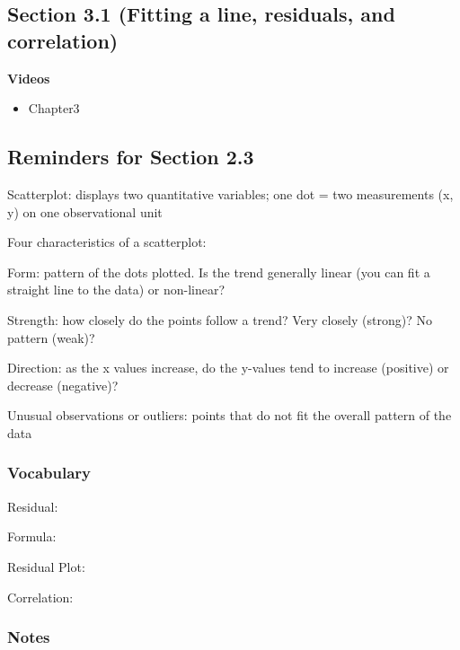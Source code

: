 \documentclass[
]{report}
\providecommand{\tightlist}{%
  \setlength{\itemsep}{0pt}\setlength{\parskip}{0pt}}
\newcommand{\rgs}{\vspace{12pt}} %
\newcommand{\rgi}{\hspace{24pt}}  %
\begin{document}
\hypertarget{section-3.1-fitting-a-line-residuals-and-correlation}{%
\subsection*{Section 3.1 (Fitting a line, residuals, and correlation)}\label{section-3.1-fitting-a-line-residuals-and-correlation}}


\textbf{Videos}

\begin{itemize}
\tightlist
\item
  Chapter3
\end{itemize}


\hypertarget{reminders-for-section-2.3}{%
\subsection{Reminders for Section 2.3}\label{reminders-for-section-2.3}}

Scatterplot: displays two quantitative variables; one dot = two measurements (x, y) on one observational unit

Four characteristics of a scatterplot:

\rgi Form: pattern of the dots plotted. Is the trend generally linear (you can fit a straight line to the data) or non-linear?

\rgi Strength: how closely do the points follow a trend? Very closely (strong)? No pattern (weak)?

\rgi Direction: as the x values increase, do the y-values tend to increase (positive) or decrease (negative)?

\rgi Unusual observations or outliers: points that do not fit the overall pattern of the data

\hypertarget{vocabulary-6}{%
\subsubsection*{Vocabulary}\label{vocabulary-6}}

Residual:
\rgs

\rgi Formula:
\rgs

Residual Plot:
\rgs

Correlation:
\rgs

\hypertarget{notes-8}{%
\subsubsection*{Notes}\label{notes-8}}
\end{document}
